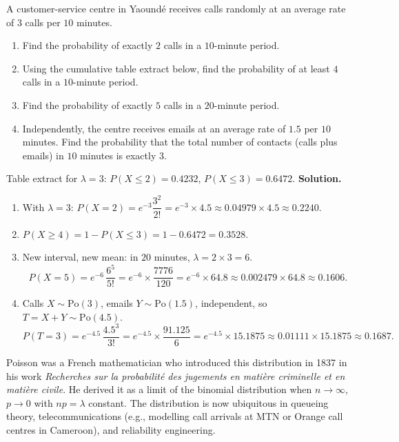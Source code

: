 \documentclass[11pt]{article}
\begin{document}
\begin{exoresolu}
A customer-service centre in Yaoundé receives calls randomly at an average rate of $3$ calls per $10$ minutes.
\begin{enumerate}
\item Find the probability of exactly $2$ calls in a $10$-minute period.
\item Using the cumulative table extract below, find the probability of at least $4$ calls in a $10$-minute period.
\item Find the probability of exactly $5$ calls in a $20$-minute period.
\item Independently, the centre receives emails at an average rate of $1.5$ per $10$ minutes. Find the probability that the total number of contacts (calls plus emails) in $10$ minutes is exactly $3$.
\end{enumerate}
Table extract for $\lambda = 3$: $P(X \leq 2) = 0.4232$, $P(X \leq 3) = 0.6472$.
\tcblower
\textbf{Solution.}
\begin{enumerate}
\item With $\lambda = 3$: $P(X = 2) = e^{-3}\dfrac{3^{2}}{2!} = e^{-3} \times 4.5 \approx 0.04979 \times 4.5 \approx 0.2240$.
\item $P(X \geq 4) = 1 - P(X \leq 3) = 1 - 0.6472 = 0.3528$.
\item New interval, new mean: in $20$ minutes, $\lambda = 2 \times 3 = 6$.
\[ P(X = 5) = e^{-6}\,\frac{6^{5}}{5!} = e^{-6} \times \frac{7776}{120} = e^{-6} \times 64.8 \approx 0.002479 \times 64.8 \approx 0.1606. \]
\item Calls $X \sim \mathrm{Po}(3)$, emails $Y \sim \mathrm{Po}(1.5)$, independent, so $T = X + Y \sim \mathrm{Po}(4.5)$.
\[ P(T = 3) = e^{-4.5}\,\frac{4.5^{3}}{3!} = e^{-4.5} \times \frac{91.125}{6} = e^{-4.5} \times 15.1875 \approx 0.01111 \times 15.1875 \approx 0.1687. \]
\end{enumerate}
\end{exoresolu}

\begin{savaistu}
Poisson was a French mathematician who introduced this distribution in 1837 in his work \emph{Recherches sur la probabilité des jugements en matière criminelle et en matière civile}. He derived it as a limit of the binomial distribution when $n \to \infty$, $p \to 0$ with $np = \lambda$ constant. The distribution is now ubiquitous in queueing theory, telecommunications (e.g., modelling call arrivals at MTN or Orange call centres in Cameroon), and reliability engineering.
\end{savaistu}
\end{document}
